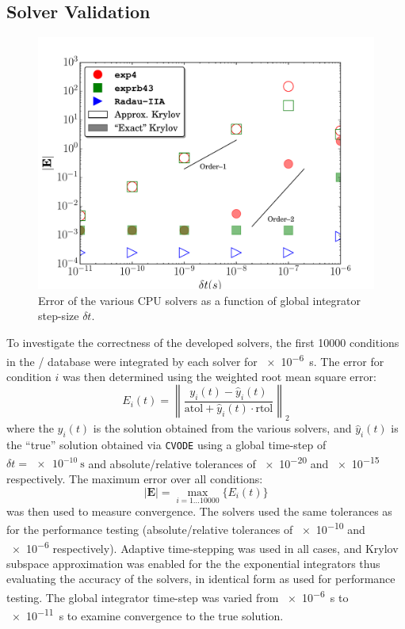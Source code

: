\documentclass[final,twocolumn]{elsarticle}
\begin{document}
\subsection{Solver Validation}
\begin{figure}[htb]
  \ifmeasure
  \fontsize{8pt}{10pt}\selectfont
  \fi
  \centering
  \includegraphics[width=0.5\linewidth]{c_nco_nosmem_error.pdf}
  \caption{Error of the various CPU solvers as a function of global integrator step-size $\delta t$.}
  \label{F:convergence}
\end{figure}

To investigate the correctness of the developed solvers, the first \num{10000} conditions in the \slash{} database were integrated by each solver for \SI{e-6}{\second}.
The error for condition $i$ was then determined using the weighted root mean square error:
\begin{equation}
 E_i(t) = \left\lVert\frac{y_i(t) - \hat{y}_i(t)}{\text{atol} + \hat{y}_i(t) \cdot \text{rtol}}\right\rVert_2
\end{equation}
where the $y_i(t)$ is the solution obtained from the various solvers, and $\hat{y}_i(t)$ is the ``true'' solution obtained via \texttt{CVODE} using a global time-step of $\delta t = \SI{e-10}{\second}$ and absolute\slash relative tolerances of \num{e-20} and \num{e-15} respectively.
The maximum error over all conditions:
\begin{equation}
 \left\lvert\textbf{E}\right\rvert = \max_{i=\num{1}\dots\num{10000}}\{E_i(t)\}
\end{equation}
was then used to measure convergence.
The solvers used the same tolerances as for the performance testing (absolute\slash relative tolerances of \num{e-10} and \num{e-6} respectively).
Adaptive time-stepping was used in all cases, and Krylov subspace approximation was enabled for the the exponential integrators thus evaluating the accuracy of the solvers, in identical form as used for performance testing.
The global integrator time-step was varied from \SI{e-6}{\second} to \SI{e-11}{\second} to examine convergence to the true solution.
\end{document}
